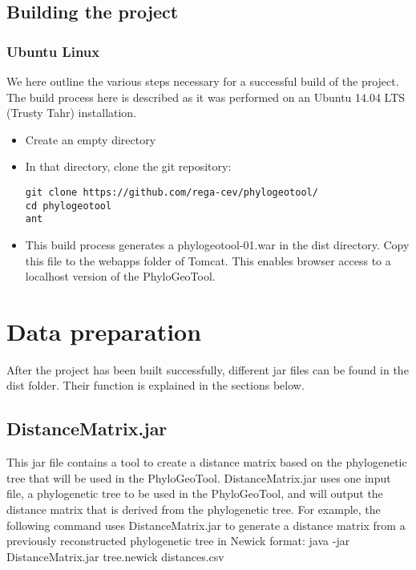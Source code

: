 \documentclass[a4paper, 11pt]{article} %
\begin{document}
\subsection{Building the project}

\subsubsection{Ubuntu Linux}

We here outline the various steps necessary for a successful build of the project.
The build process here is described as it was performed on an Ubuntu 14.04 LTS (Trusty Tahr) installation.
\begin{itemize}
\item Create an empty directory
\item {In that directory, clone the git repository: 
\begin{verbatim}
git clone https://github.com/rega-cev/phylogeotool/
cd phylogeotool
ant
\end{verbatim}
}
\item This build process generates a phylogeotool-01.war in the dist directory. Copy this file to the webapps folder of Tomcat. This enables browser access to a localhost version of the PhyloGeoTool.
\end{itemize}

\section{Data preparation}
\label{sec:jars}
After the project has been built successfully, different jar files can be found in the dist folder. 
Their function is explained in the sections below.

\subsection{DistanceMatrix.jar}
This jar file contains a tool to create a distance matrix based on the phylogenetic tree that will be used in the PhyloGeoTool.
DistanceMatrix.jar uses one input file, a phylogenetic tree to be used in the PhyloGeoTool, and will output the distance matrix that is derived from the phylogenetic tree. %
For example, the following command uses DistanceMatrix.jar to generate a distance matrix from a previously reconstructed phylogenetic tree in Newick format: 
java -jar DistanceMatrix.jar tree.newick distances.csv
\end{document}
